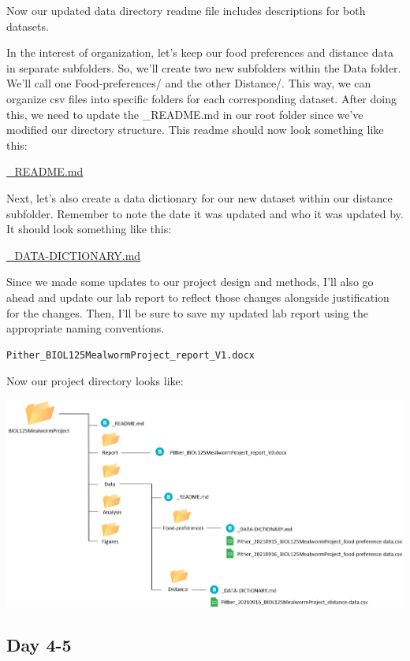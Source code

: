 \documentclass[
]{book}
\begin{document}
Now our updated data directory readme file includes descriptions for both datasets.

In the interest of organization, let's keep our food preferences and distance data in separate subfolders. So, we'll create two new subfolders within the Data folder. We'll call one Food-preferences/ and the other Distance/. This way, we can organize csv files into specific folders for each corresponding dataset. After doing this, we need to update the \_README.md in our root folder since we've modified our directory structure. This readme should now look something like this:

\href{files/DS_biol-125-readme_V1.md}{\_README.md}

Next, let's also create a data dictionary for our new dataset within our distance subfolder. Remember to note the date it was updated and who it was updated by. It should look something like this:

\href{files/DS_biol-125-data-dictionary-distance_V0.md}{\_DATA-DICTIONARY.md}

Since we made some updates to our project design and methods, I'll also go ahead and update our lab report to reflect those changes alongside justification for the changes. Then, I'll be sure to save my updated lab report using the appropriate naming conventions.

\begin{verbatim}
Pither_BIOL125MealwormProject_report_V1.docx
\end{verbatim}

Now our project directory looks like:

\includegraphics{images/DS_directory-example-3.png}

\hypertarget{day-4-5}{%
\subsection*{Day 4-5}\label{day-4-5}}
\end{document}
